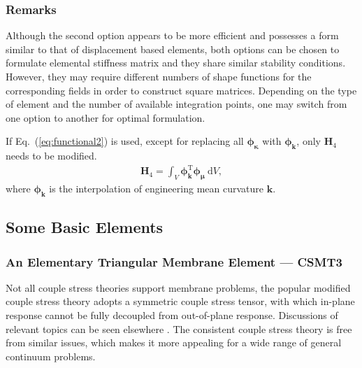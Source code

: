 \documentclass[3p,sort&compress,11pt,fleqn]{elsarticle}
\newcommand*{\eqsref}[1]{Eq.~(\ref{#1})}
\newcommand*{\mT}{\mathrm{T}}
\newcommand*{\md}[1]{\mathrm{d}#1}
\begin{document}
\subsubsection{Remarks}
Although the second option appears to be more efficient and possesses a form similar to that of displacement based elements, both options can be chosen to formulate elemental stiffness matrix and they share similar stability conditions. However, they may require different numbers of shape functions for the corresponding fields in order to construct square matrices. Depending on the type of element and the number of available integration points, one may switch from one option to another for optimal formulation.

If \eqsref{eq:functional2} is used, except for replacing all $\mathbold{\phi}_\mathbold{\kappa}$ with $\mathbold{\phi}_\mathbold{k}$, only $\mathbold{H}_4$ needs to be modified.
\begin{gather}
\mathbold{H}_4=\int_V\mathbold{\phi}_\mathbold{k}^\mT\mathbold{\phi}_\mathbold{\mu}~\md{V},
\end{gather}
where $\mathbold{\phi}_\mathbold{k}$ is the interpolation of engineering mean curvature $\mathbold{k}$.
\subsection{Some Basic Elements}
\subsubsection{An Elementary Triangular Membrane Element --- CSMT3}
Not all couple stress theories support membrane problems, the popular modified couple stress theory \citep{Yang2002} adopts a symmetric couple stress tensor, with which in-plane response cannot be fully decoupled from out-of-plane response. Discussions of relevant topics can be seen elsewhere \citep{Hadjesfandiari2016}. The consistent couple stress theory is free from similar issues, which makes it more appealing for a wide range of general continuum problems.
\end{document}
